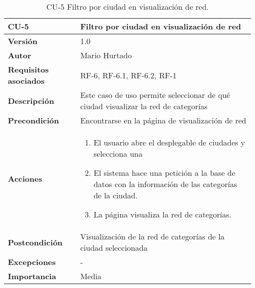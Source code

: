 \begin{table}[p]
	\centering
	\begin{tabularx}{\linewidth}{ p{} p{} }
			\toprule
			\textbf{CU-5}    & \textbf{Filtro por ciudad en visualización de red}\\
			\toprule
			\textbf{Versión}              & 1.0    \\
			\textbf{Autor}                & Mario Hurtado \\
			\textbf{Requisitos asociados} & RF-6, RF-6.1, RF-6.2, RF-1 \\
			\textbf{Descripción}          & Este caso de uso permite seleccionar de qué ciudad visualizar la red de categorías \\
			\textbf{Precondición}         & Encontrarse en la página de visualización de red\\
			\textbf{Acciones}             &
			\begin{enumerate}
					\def\labelenumi{\arabic{enumi}.}
					\tightlist
					\item El usuario abre el desplegable de ciudades y selecciona una
					\item El sistema hace una petición a la base de datos con la información de las categorías de la ciudad.
					\item La página visualiza la red de categorías.
				\end{enumerate}\\
			\textbf{Postcondición}        & Visualización de la red de categorías de la ciudad seleccionada \\
			\textbf{Excepciones}          & - \\
			\textbf{Importancia}          & Media \\
			\bottomrule
		\end{tabularx}
	\caption{CU-5 Filtro por ciudad en visualización de red.}
\end{table}
%
